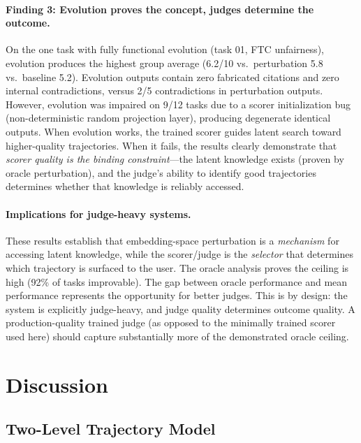 \documentclass{article}
\begin{document}
\paragraph{Finding 3: Evolution proves the concept, judges determine the outcome.}
On the one task with fully functional evolution (task 01, FTC unfairness),
evolution produces the highest group average (6.2/10 vs.\ perturbation
5.8 vs.\ baseline 5.2). Evolution outputs contain zero fabricated
citations and zero internal contradictions, versus 2/5 contradictions in
perturbation outputs. However, evolution was impaired on 9/12 tasks due
to a scorer initialization bug (non-deterministic random projection layer),
producing degenerate identical outputs. When evolution works, the trained
scorer guides latent search toward higher-quality trajectories. When it
fails, the results clearly demonstrate that \emph{scorer quality is the
binding constraint}---the latent knowledge exists (proven by oracle
perturbation), and the judge's ability to identify good trajectories
determines whether that knowledge is reliably accessed.

\paragraph{Implications for judge-heavy systems.}
These results establish that embedding-space perturbation is a
\emph{mechanism} for accessing latent knowledge, while the scorer/judge
is the \emph{selector} that determines which trajectory is surfaced to
the user. The oracle analysis proves the ceiling is high (92\% of tasks
improvable). The gap between oracle performance and mean performance
represents the opportunity for better judges. This is by design: the
system is explicitly judge-heavy, and judge quality determines outcome
quality. A production-quality trained judge (as opposed to the minimally
trained scorer used here) should capture substantially more of the
demonstrated oracle ceiling.

\section{Discussion}

\subsection{Two-Level Trajectory Model}
\end{document}
